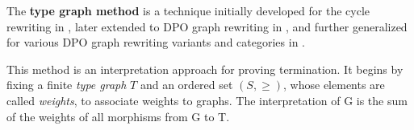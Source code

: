 

The \textbf{type graph method} is a technique initially developed for the cycle rewriting in \cite{zantema2014termination}, later extended to DPO graph rewriting in \cite{bruggink2014termination, bruggink2015proving}, and further generalized for various DPO graph rewriting variants and categories in \cite{endrullis2023generalized}.

This method is an interpretation approach \cite[see][]{nipkow1998term} for proving termination. It begins by fixing a finite \emph{type graph} \(T\) and an ordered set \((S, \geq)\), whose elements are called \emph{weights}, to associate weights to graphs. The interpretation of G is the sum of the weights of all morphisms from G to T.


